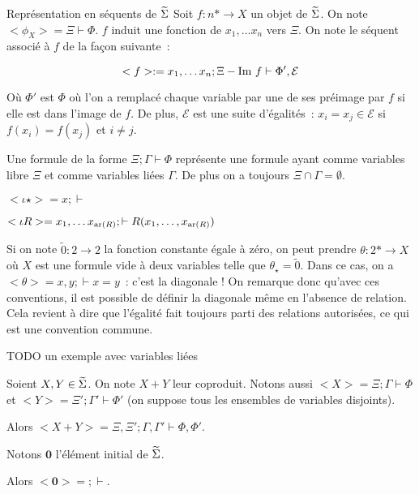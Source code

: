 \begin{defi}{Représentation en séquents de $\widetilde{\Sigma}$}
    Soit $f : n\ast\rightarrow X$ un objet de $\widetilde{\Sigma}$. On note
    $<\phi_X> = \Xi\vdash\Phi$. $f$ induit une fonction de $x_1,\dots x_n$ vers $\Xi$.
    On note le séquent associé à $f$ de la façon suivante~:

    \[ <f> := x_1, \dots x_n; \Xi - \text{Im } f\vdash \Phi',\mathcal{E} \]

    Où $\Phi'$ est $\Phi$ où l'on a remplacé chaque variable par une de ses préimage
    par $f$ si elle est dans l'image de $f$. De plus, $\mathcal{E}$ est une suite
    d'égalités~: $x_i=x_j\in\mathcal{E}$ si $f(x_i) = f(x_j)$ et $i\neq j$.

    Une formule de la forme $\Xi;\Gamma\vdash \Phi$ représente une formule ayant comme
    variables libre $\Xi$ et comme variables liées $\Gamma$. De plus on a toujours
    $\Xi\cap\Gamma=\emptyset$.
\end{defi}

\begin{exs}
    \item $<\iota\star> = x;\vdash$
    \item $<\iota R> = x_1,\dots x_{\text{ar}(R)};\vdash R(x_1, \dots, x_{\text{ar}(R)})$
    \item Si on note $\tilde{0} : 2\rightarrow 2$ la fonction constante égale à
        zéro, on peut prendre $\theta : 2\ast\rightarrow X$ où $X$ est une formule
        vide à deux variables telle que $\theta_\star = \tilde{0}$. Dans ce cas, on
        a $<\theta> = x,y;\vdash x = y$~: c'est la diagonale ! On remarque donc
        qu'avec ces conventions, il est possible de définir la diagonale même en
        l'absence de relation. Cela revient à dire que l'égalité fait toujours
        parti des relations autorisées, ce qui est une convention commune.
    \item TODO un exemple avec variables liées
\end{exs}

\begin{lem}
    Soient $X,Y\in\widetilde{\Sigma}$. On note $X+Y$ leur coproduit. Notons aussi
    $<X> = \Xi;\Gamma\vdash\Phi$ et $<Y> = \Xi';\Gamma'\vdash\Phi'$ (on suppose
    tous les ensembles de variables disjoints).
    
    Alors $<X+Y> = \Xi,\Xi';\Gamma,\Gamma'\vdash\Phi,\Phi'$.
\end{lem}

\begin{lem}
    Notons $\mathbf{0}$ l'élément initial de $\widetilde{\Sigma}$.
    
    Alors $<\mathbf{0}> = ;\vdash$.
\end{lem}

